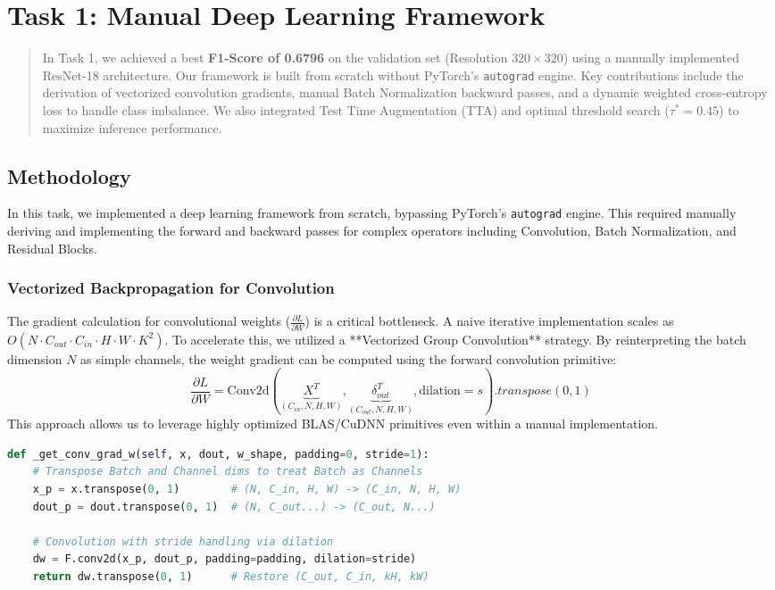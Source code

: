 \section{Task 1: Manual Deep Learning Framework}

\begin{abstract}
In Task 1, we achieved a best \textbf{F1-Score of 0.6796} on the validation set (Resolution $320 \times 320$) using a manually implemented ResNet-18 architecture. Our framework is built from scratch without PyTorch's \texttt{autograd} engine. Key contributions include the derivation of vectorized convolution gradients, manual Batch Normalization backward passes, and a dynamic weighted cross-entropy loss to handle class imbalance. We also integrated Test Time Augmentation (TTA) and optimal threshold search ($\tau^*=0.45$) to maximize inference performance.
\end{abstract}

\subsection{Methodology}
In this task, we implemented a deep learning framework from scratch, bypassing PyTorch's \texttt{autograd} engine. This required manually deriving and implementing the forward and backward passes for complex operators including Convolution, Batch Normalization, and Residual Blocks.

\subsubsection{Vectorized Backpropagation for Convolution}
The gradient calculation for convolutional weights ($\frac{\partial L}{\partial W}$) is a critical bottleneck. A naive iterative implementation scales as $O(N \cdot C_{out} \cdot C_{in} \cdot H \cdot W \cdot K^2)$. 
To accelerate this, we utilized a **Vectorized Group Convolution** strategy. By reinterpreting the batch dimension $N$ as simple channels, the weight gradient can be computed using the forward convolution primitive:
\begin{equation}
   \frac{\partial L}{\partial W} = \text{Conv2d}(\underbrace{X^T}_{(C_{in}, N, H, W)}, \underbrace{\delta_{out}^T}_{(C_{out}, N, H, W)}, \text{dilation}=s).transpose(0,1)
\end{equation}
This approach allows us to leverage highly optimized BLAS/CuDNN primitives even within a manual implementation.

\begin{lstlisting}[language=Python, caption={Vectorized Conv Weight Gradient (from model.py)}, label={lst:conv_grad}]
def _get_conv_grad_w(self, x, dout, w_shape, padding=0, stride=1):
    # Transpose Batch and Channel dims to treat Batch as Channels
    x_p = x.transpose(0, 1)        # (N, C_in, H, W) -> (C_in, N, H, W)
    dout_p = dout.transpose(0, 1)  # (N, C_out...) -> (C_out, N...)
    
    # Convolution with stride handling via dilation
    dw = F.conv2d(x_p, dout_p, padding=padding, dilation=stride)
    return dw.transpose(0, 1)      # Restore (C_out, C_in, kH, kW)
\end{lstlisting}

